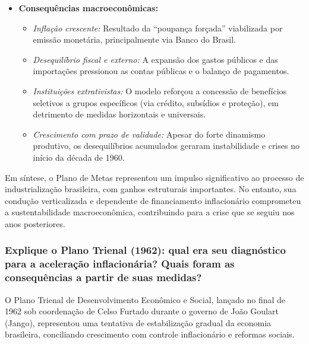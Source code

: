\documentclass[a4paper,12pt]{article}[abntex2]
\begin{document}
\begin{itemize}
    \item \textbf{Consequências macroeconômicas:}
    \begin{itemize}
        \item \textit{Inflação crescente:} Resultado da “poupança forçada” viabilizada por emissão monetária, principalmente via Banco do Brasil.
        \item \textit{Desequilíbrio fiscal e externo:} A expansão dos gastos públicos e das importações pressionou as contas públicas e o balanço de pagamentos.
        \item \textit{Instituições extrativistas:} O modelo reforçou a concessão de benefícios seletivos a grupos específicos (via crédito, subsídios e proteção), em detrimento de medidas horizontais e universais.
        \item \textit{Crescimento com prazo de validade:} Apesar do forte dinamismo produtivo, os desequilíbrios acumulados geraram instabilidade e crises no início da década de 1960.
    \end{itemize}
\end{itemize}

Em síntese, o Plano de Metas representou um impulso significativo ao processo de industrialização brasileira, com ganhos estruturais importantes. No entanto, sua condução verticalizada e dependente de financiamento inflacionário comprometeu a sustentabilidade macroeconômica, contribuindo para a crise que se seguiu nos anos posteriores.

\subsubsection{\textbf{Explique o Plano Trienal (1962): qual era seu diagnóstico para a aceleração inflacionária? Quais foram as consequências a partir de suas medidas?}}

O Plano Trienal de Desenvolvimento Econômico e Social, lançado no final de 1962 sob coordenação de Celso Furtado durante o governo de João Goulart (Jango), representou uma tentativa de estabilização gradual da economia brasileira, conciliando crescimento com controle inflacionário e reformas sociais.
\end{document}
